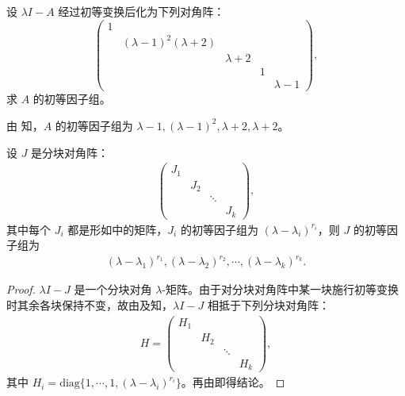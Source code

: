 \documentclass[../../main.tex]{subfiles}
\begin{document}
\begin{example}
设 $\lambda I - A$ 经过初等变换后化为下列对角阵：
\[
\begin{pmatrix}
1 & & & & \\
& (\lambda - 1)^2(\lambda + 2) & & & \\
& & \lambda + 2 & & \\
& & & 1 & \\
& & & & \lambda - 1
\end{pmatrix},
\]
求 $A$ 的初等因子组。
\end{example}
\begin{solution}
由 知，$A$ 的初等因子组为 $\lambda - 1,(\lambda - 1)^2,\lambda + 2,\lambda + 2$。
\end{solution}

\begin{lemma}\label{lemma:Jordan矩阵的初等因子组}
设 $J$ 是分块对角阵：
\begin{align*}
\begin{pmatrix}
J_1 & & & \\
& J_2 & & \\
& & \ddots & \\
& & & J_k
\end{pmatrix},
\end{align*}
其中每个 $J_i$ 都是形如中的矩阵，$J_i$ 的初等因子组为 $(\lambda - \lambda_i)^{r_i}$，则 $J$ 的初等因子组为
\begin{align*}
(\lambda - \lambda_1)^{r_1}, (\lambda - \lambda_2)^{r_2}, \cdots, (\lambda - \lambda_k)^{r_k}.
\end{align*}
\end{lemma}
\begin{proof}
$\lambda I - J$ 是一个分块对角 $\lambda$-矩阵。由于对分块对角阵中某一块施行初等变换时其余各块保持不变，故由及知，$\lambda I - J$ 相抵于下列分块对角阵：
\begin{align*}
H = \begin{pmatrix}
H_1 & & & \\
& H_2 & & \\
& & \ddots & \\
& & & H_k
\end{pmatrix},
\end{align*}
其中 $H_i = \mathrm{diag}\{1,\cdots,1,(\lambda - \lambda_i)^{r_i}\}$。再由即得结论。
\end{proof}
\end{document}
